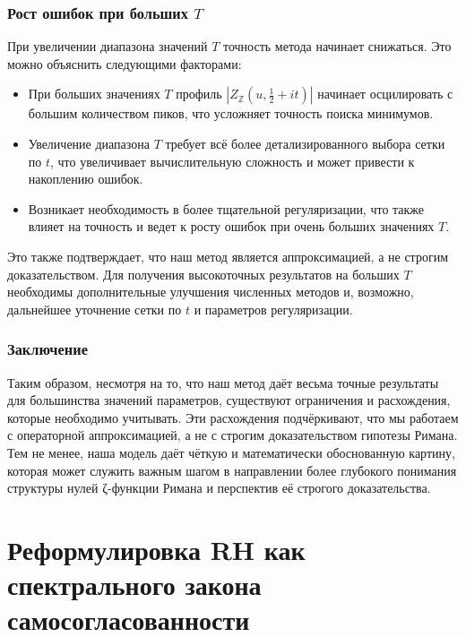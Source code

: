\documentclass{article}
\numberwithin{equation}{section}
\theoremstyle{plain}
\theoremstyle{definition}
\theoremstyle{remark}
\begin{document}
\subsubsection{Рост ошибок при больших \( T \)}
\label{subsubsec:error-growth}

\noindent
При увеличении диапазона значений \( T \) точность метода начинает снижаться. Это можно объяснить следующими факторами:
\begin{itemize}
  \item При больших значениях \( T \) профиль \( |Z_{\mathbb{Z}}(u, \frac{1}{2} + it)| \) начинает осцилировать с большим количеством пиков, что усложняет точность поиска минимумов.
  \item Увеличение диапазона \( T \) требует всё более детализированного выбора сетки по \( t \), что увеличивает вычислительную сложность и может привести к накоплению ошибок.
  \item Возникает необходимость в более тщательной регуляризации, что также влияет на точность и ведет к росту ошибок при очень больших значениях \( T \).
\end{itemize}

Это также подтверждает, что наш метод является аппроксимацией, а не строгим доказательством. Для получения высокоточных результатов на больших \( T \) необходимы дополнительные улучшения численных методов и, возможно, дальнейшее уточнение сетки по \( t \) и параметров регуляризации.

\subsubsection{Заключение}
\label{subsubsec:limitations-summary}

\noindent
Таким образом, несмотря на то, что наш метод даёт весьма точные результаты для большинства значений параметров, существуют ограничения и расхождения, которые необходимо учитывать. Эти расхождения подчёркивают, что мы работаем с операторной аппроксимацией, а не с строгим доказательством гипотезы Римана. Тем не менее, наша модель даёт чёткую и математически обоснованную картину, которая может служить важным шагом в направлении более глубокого понимания структуры нулей ζ-функции Римана и перспектив её строгого доказательства.
\clearpage

\section{Реформулировка RH как спектрального закона самосогласованности}
\label{sec:QSSC-RH}
\end{document}
